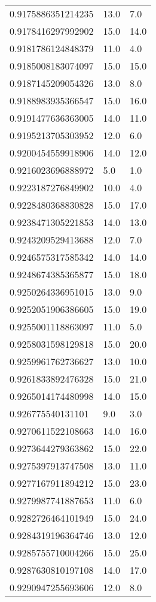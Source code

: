 \begin{center}
\begin{supertabular}[H]{p{0.30\textwidth}p{0.05\textwidth}p{0.05\textwidth}}
0.9175886351214235 & 13.0 & 7.0 \\ 
0.9178416297992902 & 15.0 & 14.0 \\ 
0.9181786124848379 & 11.0 & 4.0 \\ 
0.9185008183074097 & 15.0 & 15.0 \\ 
0.9187145209054326 & 13.0 & 8.0 \\ 
0.9188983935366547 & 15.0 & 16.0 \\ 
0.9191477636363005 & 14.0 & 11.0 \\ 
0.9195213705303952 & 12.0 & 6.0 \\ 
0.9200454559918906 & 14.0 & 12.0 \\ 
0.9216023696888972 & 5.0 & 1.0 \\ 
0.9223187276849902 & 10.0 & 4.0 \\ 
0.9228480368830828 & 15.0 & 17.0 \\ 
0.9238471305221853 & 14.0 & 13.0 \\ 
0.9243209529413688 & 12.0 & 7.0 \\ 
0.9246575317585342 & 14.0 & 14.0 \\ 
0.9248674385365877 & 15.0 & 18.0 \\ 
0.9250264336951015 & 13.0 & 9.0 \\ 
0.9252051906386605 & 15.0 & 19.0 \\ 
0.9255001118863097 & 11.0 & 5.0 \\ 
0.9258031598129818 & 15.0 & 20.0 \\ 
0.9259961762736627 & 13.0 & 10.0 \\ 
0.9261833892476328 & 15.0 & 21.0 \\ 
0.9265014174480998 & 14.0 & 15.0 \\ 
0.926775540131101 & 9.0 & 3.0 \\ 
0.9270611522108663 & 14.0 & 16.0 \\ 
0.9273644279363862 & 15.0 & 22.0 \\ 
0.9275397913747508 & 13.0 & 11.0 \\ 
0.9277167911894212 & 15.0 & 23.0 \\ 
0.9279987741887653 & 11.0 & 6.0 \\ 
0.9282726464101949 & 15.0 & 24.0 \\ 
0.9284319196364746 & 13.0 & 12.0 \\ 
0.9285755710004266 & 15.0 & 25.0 \\ 
0.9287630810197108 & 14.0 & 17.0 \\ 
0.9290947255693606 & 12.0 & 8.0 \\ 

\end{supertabular}
\end{center}
